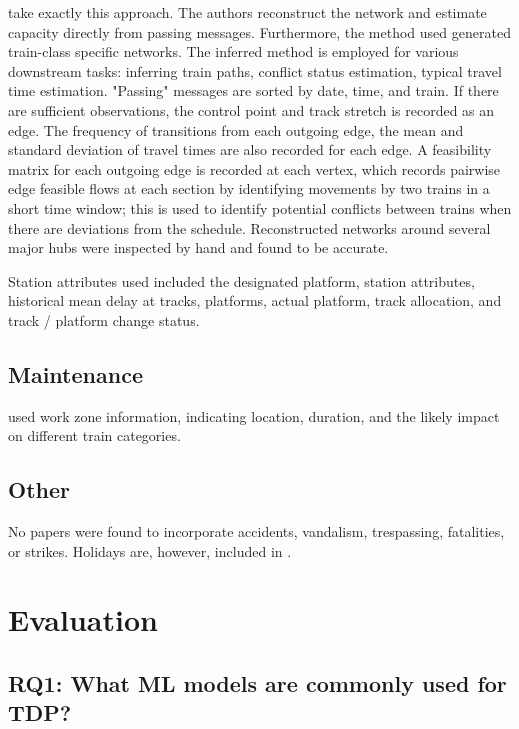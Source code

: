 \documentclass{article}
\begin{document}
\cite{nair_et_al_2019} take exactly this approach. The authors reconstruct the network and estimate capacity directly from passing messages. Furthermore, the method used generated train-class specific networks. The inferred method is employed for various downstream tasks: inferring train paths, conflict status estimation, typical travel time estimation. "Passing" messages are sorted by date, time, and train. If there are sufficient observations, the control point and track stretch is recorded as an edge. The frequency of transitions from each outgoing edge, the mean and standard deviation of travel times are also recorded for each edge. A feasibility matrix for each outgoing edge is recorded at each vertex, which records pairwise edge feasible flows at each section by identifying movements by two trains in a short time window; this is used to identify potential conflicts between trains when there are deviations from the schedule. Reconstructed networks around several major hubs were inspected by hand and found to be accurate. 

Station attributes used included the designated platform, station attributes, historical mean delay at tracks, platforms, actual platform, track allocation, and track / platform change status.


\subsection{Maintenance}

\cite{nair_et_al_2019} used work zone information, indicating location, duration, and the likely impact on different train categories.


\subsection{Other}

No papers were found to incorporate accidents, vandalism, trespassing, fatalities, or strikes. Holidays are, however, included in \cite{nair_et_al_2019}\cite{oneto_et_al_2017b}.

\clearpage
\section{Evaluation}

\subsection{RQ1: What ML models are commonly used for TDP?}
\end{document}
